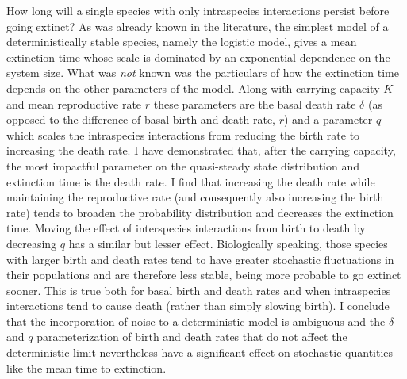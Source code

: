 How long will a single species with only intraspecies interactions persist before going extinct? 
As was already known in the literature, the simplest model of a deterministically stable species, namely the logistic model, gives a mean extinction time whose scale is dominated by an exponential dependence on the system size. 
What was \emph{not} known was the particulars of how the extinction time depends on the other parameters of the model. %
Along with carrying capacity $K$ and mean reproductive rate $r$ these parameters are the basal death rate $\delta$ (as opposed to the difference of basal birth and death rate, $r$) and a parameter $q$ which scales the intraspecies interactions from reducing the birth rate to increasing the death rate. 
I have demonstrated that, after the carrying capacity, the most impactful parameter on the quasi-steady state distribution and extinction time is the death rate. 
I find that increasing the death rate while maintaining the reproductive rate (and consequently also increasing the birth rate) tends to broaden the probability distribution and decreases the extinction time. 
Moving the effect of interspecies interactions from birth to death by decreasing $q$ has a similar but lesser effect. %
Biologically speaking, those species with larger birth and death rates tend to have greater stochastic fluctuations in their populations and are therefore less stable, being more probable to go extinct sooner. 
This is true both for basal birth and death rates and when intraspecies interactions tend to cause death (rather than simply slowing birth). 
I conclude that the incorporation of noise to a deterministic model is ambiguous and the $\delta$ and $q$ parameterization of birth and death rates that do not affect the deterministic limit nevertheless have a significant effect on stochastic quantities like the mean time to extinction. 
